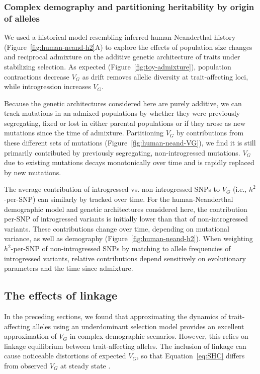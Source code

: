 \documentclass{article}
\begin{document}
\subsubsection*{Complex demography and partitioning heritability by origin of
alleles}

We used a historical model resembling inferred human-Neanderthal history
(Figure~\ref{fig:human-neand-h2}A) to explore the effects of population size
changes and reciprocal admixture on the additive genetic architecture of traits
under stabilizing selection. As expected (Figure~\ref{fig:toy-admixture}),
population contractions decrease $V_G$ as drift removes allelic diversity at
trait-affecting loci, while introgression increases $V_G$.

Because the genetic architectures considered here are purely additive, we can
track mutations in an admixed populations by whether they were previously
segregating, fixed or lost in either parental populations or if they arose as
new mutations since the time of admixture. Partitioning $V_G$ by contributions
from these different sets of mutations (Figure~\ref{fig:human-neand-VG}), we
find it is still primarily contributed by previously segregating,
non-introgressed mutations. $V_G$ due to existing mutations decays
monotonically over time and is rapidly replaced by new mutations.

The average contribution of introgressed vs. non-introgressed SNPs to $V_G$
(i.e., $h^2$-per-SNP) can similarly by tracked over time. For the
human-Neanderthal demographic model and genetic architectures considered
here, the contribution per-SNP of introgressed variants is initially lower than
that of non-introgressed variants. These contributions change over time,
depending on mutational variance, as well as demography
(Figure~\ref{fig:human-neand-h2}). When weighting $h^2$-per-SNP of
non-introgressed SNPs by matching to allele frequencies of introgressed
variants, relative contributions depend sensitively on evolutionary parameters
and the time since admixture.

\subsection*{The effects of linkage}

In the preceding sections, we found that approximating the dynamics of
trait-affecting alleles using an underdominant selection model
\citep{robertson1956effect} provides an excellent approximation of $V_G$ in
complex demographic scenarios. However, this relies on linkage equilibrium
between trait-affecting alleles. The inclusion of linkage can cause noticeable
distortions of expected $V_G$, so that Equation~\ref{eq:SHC} differs from
observed $V_G$ at steady state \citep{burger1989much, burger1994distribution,
walsh2018evolution}.
\end{document}
